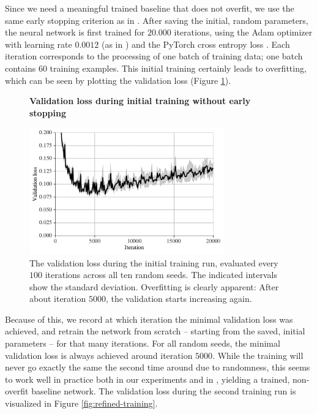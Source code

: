 \documentclass[12pt,final,twoside]{article}
\theoremstyle{plain}
\theoremstyle{definition}
\theoremstyle{remark}
\theoremstyle{named}
\begin{document}
Since we need a meaningful trained baseline that does not overfit, we use the same early stopping criterion as in \cite{supermask}. After saving the initial, random parameters, the neural network is first trained for $20.000$ iterations, using the Adam optimizer \cite{adam} with learning rate $0.0012$ (as in \cite{supermask}) and the PyTorch cross entropy loss \cite{pytorch}. Each iteration corresponds to the processing of one batch of training data; one batch contains $60$ training examples. This initial training certainly leads to overfitting, which can be seen by plotting the validation loss (Figure \ref{fig:initial-training}).

\begin{figure}[h]
  \centering
  \textbf{Validation loss during initial training without early stopping}\par\medskip
  \includegraphics[width=0.75\textwidth]{plots/initial_trainings.pdf}
  \caption{The validation loss during the initial training run, evaluated every $100$ iterations across all ten random seeds. The indicated intervals show the standard deviation. Overfitting is clearly apparent: After about iteration $5000$, the validation starts increasing again.}
  \label{fig:initial-training}
\end{figure}

Because of this, we record at which iteration the minimal validation loss was achieved, and retrain the network from scratch -- starting from the saved, initial parameters -- for that many iterations. For all random seeds, the minimal validation loss is always achieved around iteration $5000$. While the training will never go exactly the same the second time around due to randomness, this seems to work well in practice both in our experiments and in \cite{supermask}, yielding a trained, non-overfit baseline network. The validation loss during the second training run is visualized in Figure \ref{fig:refined-training}.
\end{document}
